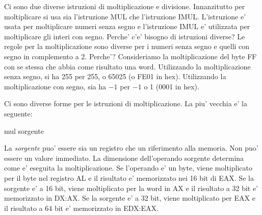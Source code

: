 Ci sono due diverse istruzioni di moltiplicazione e divisione. Innanzitutto
per moltiplicare si usa sia l'istruzione {\code MUL} che l'istruzione
{\code IMUL}. L'istruzione e' usata per moltiplicare numeri senza
segno e l'istruzione {\code IMUL} e' utilizzata per moltiplicare
gli interi con segno. Perche' c'e' bisogno di istruzioni diverse?
Le regole per la moltiplicazione sono diverse per i numeri senza
segno e quelli con segno in complemento a 2. Perche'? Consideriamo
la moltiplicazione del byte FF con se stessa che abbia come risultato
una word. Utilizzando la moltiplicazione senza segno, si ha 255 per
255, o 65025 (o FE01 in hex). Utilizzando la moltiplicazione con
segno, sia ha $-1$ per $-1$ o 1 (0001 in hex).  

Ci sono diverse forme per le istruzioni di moltiplicazione. La piu'
vecchia e' la seguente:
\begin{AsmCodeListing}[numbers=none,frame=none]
      mul   sorgente
\end{AsmCodeListing}
La \emph{sorgente} puo' essere sia un registro che un  riferimento alla memoria.
Non puo' essere un valore immediato. La dimensione dell'operando sorgente 
determina come e' eseguita la moltiplicazione. Se l'operando e' un byte, viene
moltiplicato per il byte nel registro AL e il risultato e' memorizzato
nei 16 bit di EAX. Se la sorgente e' a 16 bit, viene moltiplicato per la
word in AX e il risultato a 32 bit e' memorizzato in DX:AX. Se la
sorgente e' a 32 bit, viene moltiplicato per EAX e il risultato a 64 bit
e' memorizzato in EDX:EAX.

